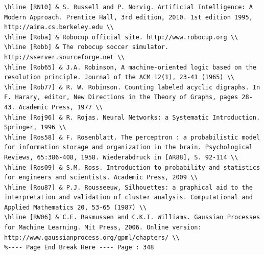 \documentclass[10pt]{article}
\begin{document}
\begin{verbatim}
\hline [RN10] & S. Russell and P. Norvig. Artificial Intelligence: A Modern Approach. Prentice Hall, 3rd edition, 2010. 1st edition 1995, http://aima.cs.berkeley.edu \\
\hline [Roba] & Robocup official site. http://www.robocup.org \\
\hline [Robb] & The robocup soccer simulator. http://sserver.sourceforge.net \\
\hline [Rob65] & J.A. Robinson, A machine-oriented logic based on the resolution principle. Journal of the ACM 12(1), 23-41 (1965) \\
\hline [Rob77] & R. W. Robinson. Counting labeled acyclic digraphs. In F. Harary, editor, New Directions in the Theory of Graphs, pages 28-43. Academic Press, 1977 \\
\hline [Roj96] & R. Rojas. Neural Networks: a Systematic Introduction. Springer, 1996 \\
\hline [Ros58] & F. Rosenblatt. The perceptron : a probabilistic model for information storage and organization in the brain. Psychological Reviews, 65:386-408, 1958. Wiederabdruck in [AR88], S. 92-114 \\
\hline [Ros09] & S.M. Ross. Introduction to probability and statistics for engineers and scientists. Academic Press, 2009 \\
\hline [Rou87] & P.J. Rousseeuw, Silhouettes: a graphical aid to the interpretation and validation of cluster analysis. Computational and Applied Mathematics 20, 53-65 (1987) \\
\hline [RW06] & C.E. Rasmussen and C.K.I. Williams. Gaussian Processes for Machine Learning. Mit Press, 2006. Online version: http://www.gaussianprocess.org/gpml/chapters/ \\
%---- Page End Break Here ---- Page : 348


\end{verbatim}
\end{document}
